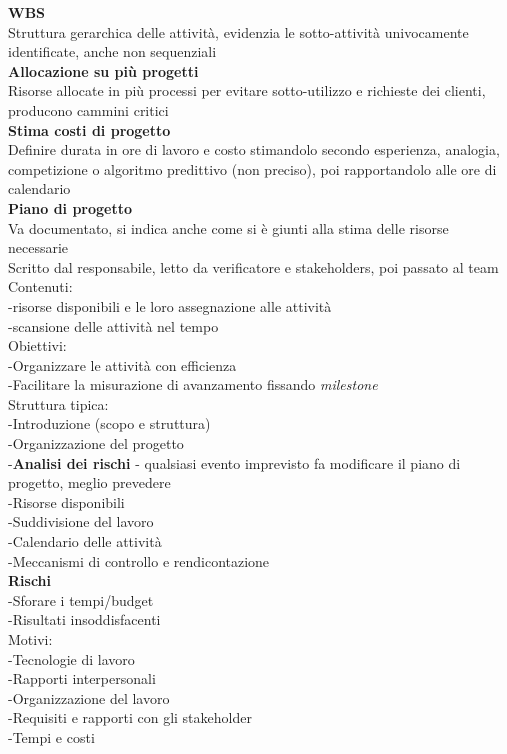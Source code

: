 \documentclass{article}
\begin{document}
			\textbf{WBS}\\
			Struttura gerarchica delle attività, evidenzia le sotto-attività univocamente identificate, anche non sequenziali\\
			
			\textbf{Allocazione su più progetti}\\
			Risorse allocate in più processi per evitare sotto-utilizzo e richieste dei clienti, producono cammini critici\\
			
			\textbf{Stima costi di progetto}\\
			Definire durata in ore di lavoro e costo stimandolo secondo esperienza, analogia, competizione o algoritmo predittivo (non preciso), poi rapportandolo alle ore di calendario\\
			
			\textbf{Piano di progetto}\\
			Va documentato, si indica anche come si è giunti alla stima delle risorse necessarie\\
			Scritto dal responsabile, letto da verificatore e stakeholders, poi passato al team\\
			Contenuti:\\
			-risorse disponibili e le loro assegnazione alle attività\\
			-scansione delle attività nel tempo\\
			Obiettivi:\\
			-Organizzare le attività con efficienza\\
			-Facilitare la misurazione di avanzamento fissando \textit{milestone}\\
			Struttura tipica:\\
			-Introduzione (scopo e struttura)\\
			-Organizzazione del progetto\\
			-\textbf{Analisi dei rischi} - qualsiasi evento imprevisto fa modificare il piano di progetto, meglio prevedere\\
			-Risorse disponibili\\
			-Suddivisione del lavoro\\
			-Calendario delle attività\\
			-Meccanismi di controllo e rendicontazione\\
			
			\textbf{Rischi}\\
			-Sforare i tempi/budget\\
			-Risultati insoddisfacenti\\
			Motivi:\\
			-Tecnologie di lavoro\\
			-Rapporti interpersonali\\
			-Organizzazione del lavoro\\
			-Requisiti e rapporti con gli stakeholder\\
			-Tempi e costi\\
		
\end{document}
